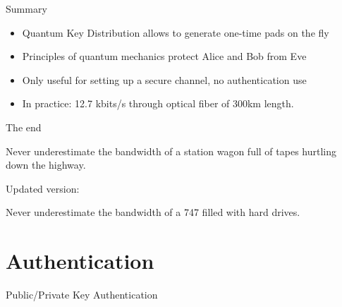 \documentclass{beamer}
\begin{document}
	\begin{frame}{Summary} %
		\begin{itemize}
			\item Quantum Key Distribution allows to generate one-time pads on the fly
			\item Principles of quantum mechanics protect Alice and Bob from Eve
			\item Only useful for setting up a secure channel, no authentication use
			\item In practice: 12.7 kbits/s through optical fiber of 300km length.
		\end{itemize}
	\end{frame}

	\begin{frame}{The end}
		\begin{shadequote}{}
			Never underestimate the bandwidth of a station wagon full of tapes hurtling down the highway.
		\end{shadequote}

		\vspace{1em}
		Updated version:
		\vspace{0.5em}


		\begin{shadequote}{}
			Never underestimate the bandwidth of a 747 filled with hard drives.
		\end{shadequote}
	\end{frame}


	\section{Authentication}

	\begin{frame}{Public/Private Key Authentication} %

	\end{frame}


	\begin{frame}[plain]\end{frame}
\end{document}
